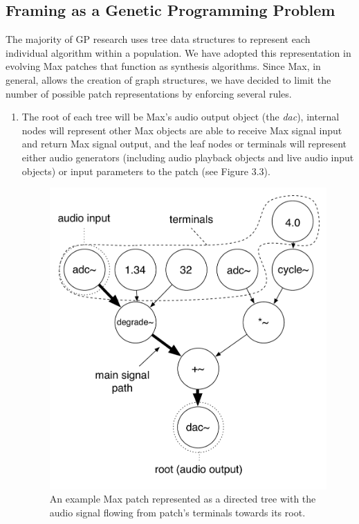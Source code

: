 \documentclass[a4paper,12pt]{report} 	%
\numberwithin{figure}{chapter}
\numberwithin{table}{chapter}
\numberwithin{equation}{chapter}
\begin{document}
\begin{flushleft}
\subsection{Framing as a Genetic Programming Problem}
The majority of GP research uses tree data structures to represent each individual algorithm within a population. We have adopted this representation in evolving Max patches that function as synthesis algorithms. Since Max, in general, allows the creation of graph structures, we have decided to limit the number of possible patch representations by enforcing several rules. 
\begin{enumerate}
\item The root of each tree will be Max's audio output object (the \emph{dac\texttildelow{}}), internal nodes will represent other Max objects are able to receive Max signal input and return Max signal output, and the leaf nodes or terminals will represent either audio generators (including audio playback objects and live audio input objects) or input parameters to the patch (see Figure 3.3).
\begin{figure}[h!]
\begin{center}
\includegraphics[scale=0.7]{RootTree}
\caption[A Max Patch as a Directed Tree]{An example Max patch represented as a directed tree with the audio signal flowing from patch's terminals towards its root.}

\end{center}
\end{figure}
\end{enumerate}
\end{flushleft}
\end{document}
